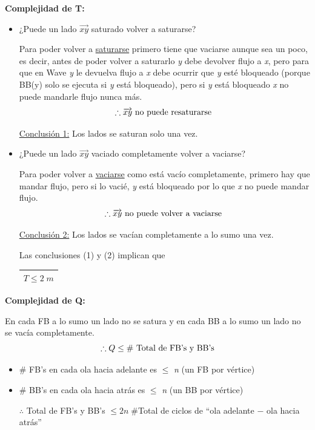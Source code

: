 \documentclass[12pt,a4paper]{report}
\begin{document}
			\pagebreak
			\textbf{Complejidad de T:}
			\begin{itemize}
				\item ¿Puede un lado $\overrightarrow{xy}$ saturado volver a saturarse?
					\par Para poder volver a \underline{saturarse} primero tiene que vaciarse aunque sea un poco, es decir, antes de poder volver a saturarlo \textit{y} debe devolver flujo a \textit{x}, pero para que en Wave \textit{y} le devuelva flujo a \textit{x} debe ocurrir que \textit{y} esté bloqueado (porque BB(y) solo se ejecuta si \textit{y} está bloqueado), pero si \textit{y} está bloqueado \textit{x} no puede mandarle flujo nunca más.
					\[ \therefore \overrightarrow{xy} \textup{ no puede resaturarse } \]
					\par \underline{Conclusión 1:} Los lados se saturan solo una vez.
				\item ¿Puede un lado $\overrightarrow{xy}$ vaciado completamente volver a vaciarse?
					\par Para poder volver a \underline{vaciarse} como está vacío completamente, primero hay que mandar flujo, pero si lo vacié, \textit{y} está bloqueado por lo que \textit{x} no puede mandar flujo.
					\[ \therefore \overrightarrow{xy} \textup{ no puede volver a vaciarse } \]
					\par \underline{Conclusión 2:} Los lados se vacían completamente a lo sumo una vez.

				\par Las conclusiones (1) y (2) implican que \begin{tabular}{|c|} \hline $T \leq 2 \; m$ \\\hline \end{tabular}
			\end{itemize}

			\textbf{Complejidad de Q:}
				\vspace{3mm}
				\par En cada FB a lo sumo un lado no se satura y en cada BB a lo sumo un lado no se vacía completamente.
				\[ \therefore Q \leq \# \textup{ Total de FB's y BB's} \]
				\begin{itemize}
					\item \# FB's en cada ola hacia adelante es $\leq$ \textit{n} (un FB por vértice)
					\item \# BB's en cada ola hacia atrás es $\leq$ \textit{n} (un BB por vértice)

					\vspace{5mm}
					\par $\therefore$ Total de FB's y BB's $\leq 2 n \; \#$Total de ciclos de \textquotedblleft ola adelante $-$ ola hacia atrás\textquotedblright
	 			\end{itemize}
\end{document}
